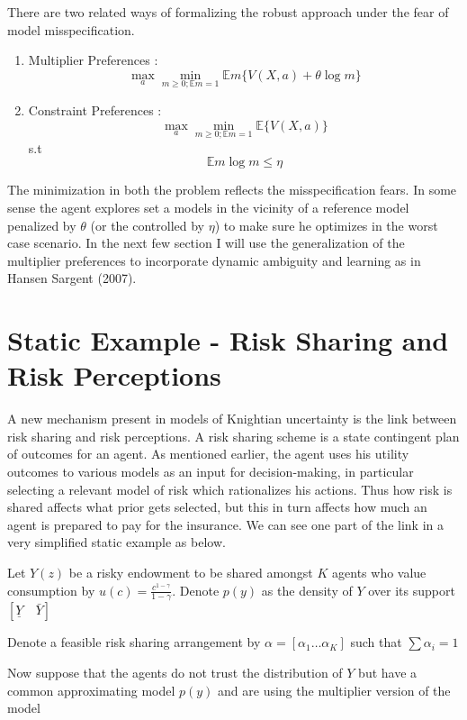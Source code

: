 \documentclass[12pt]{article}
\begin{document}
There are two related ways of formalizing the robust approach under the fear of model misspecification. 
\begin{enumerate}
	\item Multiplier Preferences : \[\max_{a}\min_{m\geq 0; \mathbb{E}m=1} \mathbb{E}m\{V(X,a) + \theta \log m \}\]
	\item Constraint Preferences : \[\max_{a}\min_{m\geq 0; \mathbb{E}m=1} \mathbb{E}\{V(X,a) \}\]
	s.t 
	\[\mathbb{E}m\log m \leq \eta\]
	
\end{enumerate}
The minimization in both the problem reflects the misspecification fears. In some sense the agent explores set a models in the vicinity of a reference model penalized by $\theta$ (or the controlled by $\eta$) to make sure he optimizes in the worst case scenario. In the next few section I will use the generalization of the multiplier preferences to incorporate dynamic ambiguity and learning as in Hansen Sargent (2007).
	
\section{Static Example - Risk Sharing and Risk Perceptions}
A new mechanism present in models of Knightian uncertainty is the link between risk sharing and risk perceptions. A risk sharing scheme is a state contingent plan of outcomes for an agent. As mentioned earlier, the agent uses his utility outcomes to various models as an input for decision-making, in particular selecting a relevant model of risk which rationalizes his actions. Thus how risk is shared affects what prior gets selected, but this in turn affects how much an agent is prepared to pay for the insurance. We can see one part of the link in a very simplified static example as below.
\vspace{10 mm}

\noindent Let $Y(z)$ be a risky endowment to be shared amongst $K$ agents who value consumption by $u(c)=\frac{c^{1-\gamma}}{1-\gamma}$. Denote $p(y)$ as the density of $Y$ over its support $[\underline{Y} \quad \bar{Y}]$

\noindent  Denote a feasible risk sharing arrangement by $\alpha = [\alpha_1 \dots \alpha_K]$ such that $\sum \alpha_i=1$

\noindent  Now suppose that the agents do not trust the distribution of $Y$ but have a common approximating model $p(y)$ and are using the multiplier version of the model
\end{document}
